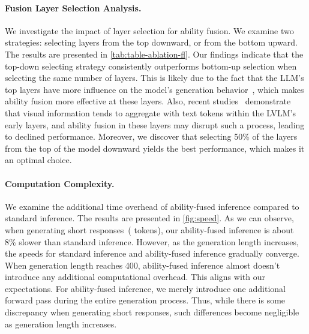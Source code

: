 \paragraph{Fusion Layer Selection Analysis.}

We investigate the impact of layer selection for ability fusion. We examine two strategies: selecting layers from the top downward, or from the bottom upward. The results are presented in \autoref{tab:table-ablation-fl}. Our findings indicate that the top-down selecting strategy consistently outperforms bottom-up selection when selecting the same number of layers. This is likely due to the fact that the LLM's top layers have more influence on the model's generation behavior~\cite{geva2020transformer,geva2022transformer}, which makes ability fusion more effective at these layers. Also, recent studies~\cite{chen2025image,zhang2025llava} demonstrate that visual information tends to aggregate with text tokens within the LVLM's early layers, and ability fusion in these layers may disrupt such a process, leading to declined performance. Moreover, we discover that selecting 50\% of the layers from the top of the model downward yields the best performance, which makes it an optimal choice.



\paragraph{Computation Complexity.}
We examine the additional time overhead of ability-fused inference compared to standard inference. The results are presented in \autoref{fig:speed}.
As we can observe, when generating short responses~( tokens), our ability-fused inference is about 8\% slower than standard inference. However, as the generation length increases, the speeds for standard inference and ability-fused inference gradually converge. When generation length reaches 400, ability-fused inference almost doesn't introduce any additional computational overhead. This aligns with our expectations. For ability-fused inference, we merely introduce one additional forward pass during the entire generation process. Thus, while there is some discrepancy when generating short responses, such differences become negligible as generation length increases.



